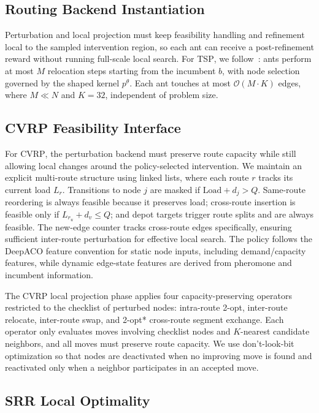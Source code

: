 \documentclass[journal]{IEEEtai}
\newcommand{\TSP}{\textsc{TSP}}
\newcommand{\CVRP}{\textsc{CVRP}}
\begin{document}
\subsection{Routing Backend Instantiation}
\label{app:backend}

Perturbation and local projection must keep feasibility handling and refinement local to the sampled intervention region, so each ant can receive a post-refinement reward without running full-scale local search. For \TSP{}, we follow~\cite{faco}: ants perform at most $M$ relocation steps starting from the incumbent $b$, with node selection governed by the shaped kernel $p^\theta$. Each ant touches at most $\mathcal{O}(M \cdot K)$ edges, where $M \ll N$ and $K{=}32$, independent of problem size.

\subsection{CVRP Feasibility Interface}
\label{app:cvrp}

For \CVRP{}, the perturbation backend must preserve route capacity while still allowing local changes around the policy-selected intervention. We maintain an explicit multi-route structure using linked lists, where each route $r$ tracks its current load $L_r$. Transitions to node $j$ are masked if $\mathrm{Load}+d_j>Q$. Same-route reordering is always feasible because it preserves load; cross-route insertion is feasible only if $L_{r_u}+d_v\le Q$; and depot targets trigger route splits and are always feasible. The new-edge counter tracks cross-route edges specifically, ensuring sufficient inter-route perturbation for effective local search. The policy follows the DeepACO feature convention for static node inputs, including demand/capacity features, while dynamic edge-state features are derived from pheromone and incumbent information.

The CVRP local projection phase applies four capacity-preserving operators restricted to the checklist of perturbed nodes: intra-route 2-opt, inter-route relocate, inter-route swap, and 2-opt* cross-route segment exchange. Each operator only evaluates moves involving checklist nodes and $K$-nearest candidate neighbors, and all moves must preserve route capacity. We use don't-look-bit optimization so that nodes are deactivated when no improving move is found and reactivated only when a neighbor participates in an accepted move.

\subsection{SRR Local Optimality}
\label{app:credit}
\end{document}
